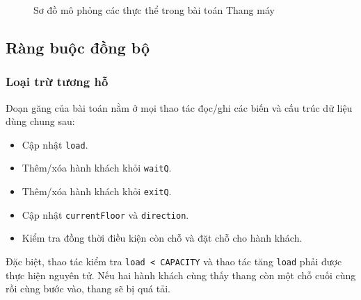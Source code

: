 \begin{figure}[H]
\centering
{}
\caption{Sơ đồ mô phỏng các thực thể trong bài toán Thang máy}
\label{fig:elevator-model-new-template}
\end{figure}

\subsection{Ràng buộc đồng bộ}

\subsubsection*{Loại trừ tương hỗ}

Đoạn găng của bài toán nằm ở mọi thao tác đọc/ghi các biến và cấu trúc
dữ liệu dùng chung sau:

\begin{itemize}
    \item Cập nhật \texttt{load}.
    \item Thêm/xóa hành khách khỏi \texttt{waitQ}.
    \item Thêm/xóa hành khách khỏi \texttt{exitQ}.
    \item Cập nhật \texttt{currentFloor} và \texttt{direction}.
    \item Kiểm tra đồng thời điều kiện còn chỗ và đặt chỗ cho hành khách.
\end{itemize}

Đặc biệt, thao tác kiểm tra \texttt{load < CAPACITY} và thao tác tăng
\texttt{load} phải được thực hiện nguyên tử. Nếu hai hành khách cùng thấy
thang còn một chỗ cuối cùng rồi cùng bước vào, thang sẽ bị quá tải.

